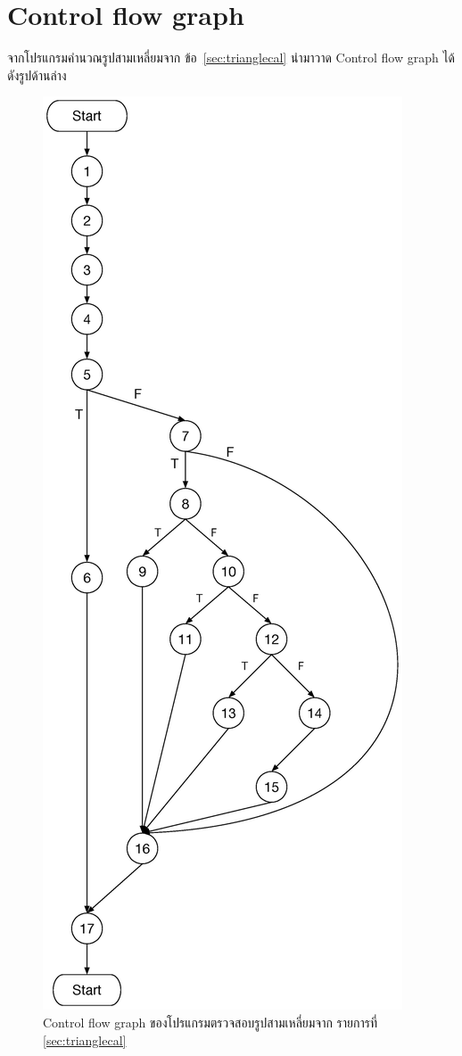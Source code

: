 \documentclass[12pt,a4paper]{article}
\newcommand{\numbername}{ข้อ}
\renewcommand{\lstlistingname}{รายการที่}
\begin{document}
\newpage
\clearpage
\section{Control flow graph}
จากโปรแกรมคำนวณรูปสามเหลี่ยมจาก \numbername~\ref{sec:trianglecal} นำมาวาด Control flow graph ได้ดังรูปด้านล่าง

\begin{figure}[h!]
    \label{fig:flowgraph}
    \centering
    \includegraphics[height=0.8\textheight]{img/graph-testing-pythagorus.eps}
    \caption{Control flow graph ของโปรแกรมตรวจสอบรูปสามเหลี่ยมจาก \lstlistingname\, \ref{sec:trianglecal}}
\end{figure}
\end{document}
